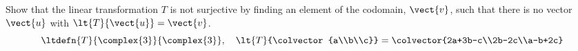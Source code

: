 Show that the linear transformation $T$ is not surjective by finding an element of the codomain, $\vect{v}$,  such that there is  no vector $\vect{u}$ with $\lt{T}{\vect{u}}=\vect{v}$.
%
\begin{equation*}
\ltdefn{T}{\complex{3}}{\complex{3}},\quad 
\lt{T}{\colvector{a\\b\\c}}=
\colvector{2a+3b-c\\2b-2c\\a-b+2c}
\end{equation*}